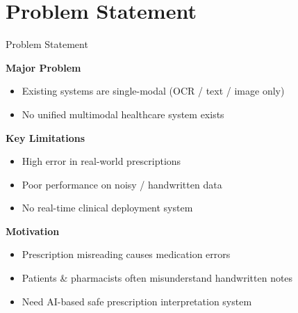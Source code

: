 \documentclass[11pt,aspectratio=169]{beamer}
\begin{document}
\section{Problem Statement}
\begin{frame}{Problem Statement}

\textbf{Major Problem}
\begin{itemize}
    \item Existing systems are single-modal (OCR / text / image only)
    \item No unified multimodal healthcare system exists
\end{itemize}

\vspace{0.3cm}

\textbf{Key Limitations}
\begin{itemize}
    \item High error in real-world prescriptions
    \item Poor performance on noisy / handwritten data
    \item No real-time clinical deployment system
\end{itemize}

\vspace{0.3cm}

\textbf{Motivation}
\begin{itemize}
    \item Prescription misreading causes medication errors
    \item Patients \& pharmacists often misunderstand handwritten notes
    \item Need AI-based safe prescription interpretation system
\end{itemize}

\end{frame}
\end{document}
